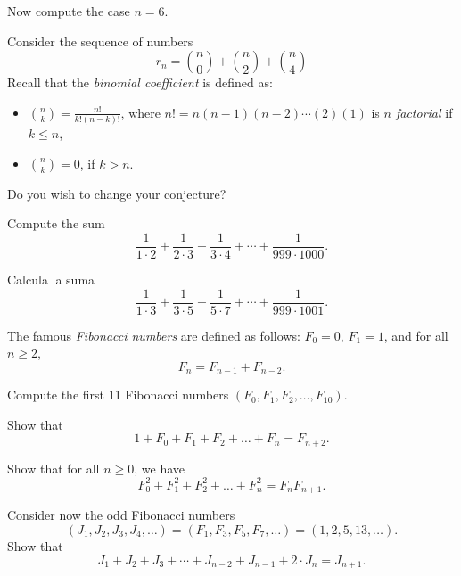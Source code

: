 \begin{exercise}
  Now compute the case $n=6$.
\end{exercise}
\tutpagebreak
  
\begin{exercise}
  Consider the sequence of numbers $$r_n = {n \choose 0} + {n \choose 2} + {n \choose 4}$$
  Recall that the \emph{binomial coefficient} is defined as:
  \begin{itemize}
    \item   ${n \choose k} = \frac{n!}{k! (n-k)!}$,
    where $n!=n(n-1)(n-2) \cdots (2)(1)$ is \emph{$n$ factorial} if $k\leq n$,
    \item ${n \choose k} =0$, if $k>n$.
  \end{itemize}

  Do you wish to change your conjecture?
\end{exercise}
\tutpagebreak

\begin{exercise}
Compute the sum $$\frac{1}{1 \cdot 2}+\frac{1}{2 \cdot 3}+\frac{1}{3 \cdot 4}+\cdots+\frac{1}{999 \cdot 1000}.$$
\end{exercise}

\begin{exercise}
Calcula la suma $$\frac{1}{1 \cdot 3}+\frac{1}{3 \cdot 5}+\frac{1}{5 \cdot 7}+\cdots+\frac{1}{999 \cdot 1001}.$$
\end{exercise}
\vspace{1.5cm}
\tutpagebreak

The famous \emph{Fibonacci numbers} are defined as follows:
$F_0=0$, $F_1=1$, and for all $n\geq 2$, $$F_n=F_{n-1}+F_{n-2}.$$

\begin{exercise}
Compute the first 11 Fibonacci numbers $(F_0,F_1,F_2,\dots,F_{10})$.
\end{exercise}

\begin{exercise}
Show that $$1+F_0+F_1+F_2+\dots +F_n=F_{n+2}.$$
\end{exercise}

\begin{exercise}
Show that for all $n\geq 0$, we have $$F_0^2+F_1^2+F_2^2+\dots +F_n^2=F_{n}F_{n+1}.$$
\end{exercise}
\tutpagebreak

\begin{exercise}
Consider now the odd Fibonacci numbers $$(J_1,J_2,J_3,J_4,\dots)=(F_1,F_3,F_5,F_7,\dots)=(1,2,5,13,\dots).$$
Show that $$J_1+J_2+J_3+\cdots + J_{n-2}+J_{n-1}+ 2\cdot J_{n}=J_{n+1}.$$
\end{exercise}

